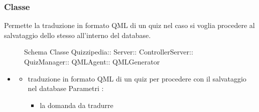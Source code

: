 \subsubsection{Classe }
Permette la traduzione in formato QML di un quiz nel caso si voglia procedere al salvataggio dello stesso all'interno del database.
\begin{figure}[H]
\centering
\noindent{}
\caption[Schema Classe QMLGenerator]{Schema Classe Quizzipedia:: Server:: ControllerServer:: QuizManager:: QMLAgent:: QMLGenerator}
\end{figure}
\begin{itemize}
\item {}
\begin{itemize}
\item {}
\newline
traduzione in formato QML di un quiz per procedere con il salvataggio nel database
\newline
Parametri :
\begin{itemize}
\item {}
\newline
la domanda da tradurre
\end{itemize}
\end{itemize}
\end{itemize}
